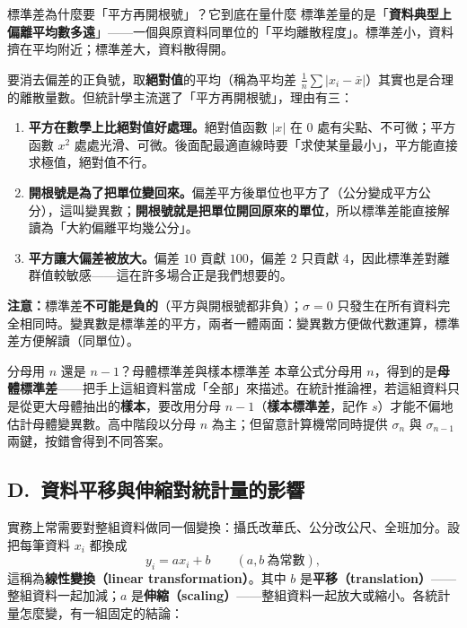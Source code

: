 \documentclass[11pt]{article}
\begin{document}
\begin{補充框}{標準差為什麼要「平方再開根號」？它到底在量什麼}
標準差量的是「\textbf{資料典型上偏離平均數多遠}」——一個與原資料同單位的「平均離散程度」。標準差小，資料擠在平均附近；標準差大，資料散得開。

要消去偏差的正負號，取\textbf{絕對值}的平均（稱為平均差 $\frac1n\sum|x_i-\bar x|$）其實也是合理的離散量數。但統計學主流選了「平方再開根號」，理由有三：
\begin{enumerate}\setlength{\itemsep}{2pt}
\item \textbf{平方在數學上比絕對值好處理。}絕對值函數 $|x|$ 在 $0$ 處有尖點、不可微；平方函數 $x^2$ 處處光滑、可微。後面配最適直線時要「求使某量最小」，平方能直接求極值，絕對值不行。
\item \textbf{開根號是為了把單位變回來。}偏差平方後單位也平方了（公分變成平方公分），這叫變異數；\textbf{開根號就是把單位開回原來的單位}，所以標準差能直接解讀為「大約偏離平均幾公分」。
\item \textbf{平方讓大偏差被放大。}偏差 $10$ 貢獻 $100$，偏差 $2$ 只貢獻 $4$，因此標準差對離群值較敏感——這在許多場合正是我們想要的。
\end{enumerate}
\textbf{注意：}標準差\textbf{不可能是負的}（平方與開根號都非負）；$\sigma=0$ 只發生在所有資料完全相同時。變異數是標準差的平方，兩者一體兩面：變異數方便做代數運算，標準差方便解讀（同單位）。
\end{補充框}


\begin{補充框}{分母用 $n$ 還是 $n-1$？母體標準差與樣本標準差}
本章公式分母用 $n$，得到的是\textbf{母體標準差}——把手上這組資料當成「全部」來描述。在統計推論裡，若這組資料只是從更大母體抽出的\textbf{樣本}，要改用分母 $n-1$（\textbf{樣本標準差}，記作 $s$）才能不偏地估計母體變異數。高中階段以分母 $n$ 為主；但留意計算機常同時提供 $\sigma_n$ 與 $\sigma_{n-1}$ 兩鍵，按錯會得到不同答案。
\end{補充框}

\subsection*{\sffamily D.\ 資料平移與伸縮對統計量的影響}

實務上常需要對整組資料做同一個變換：攝氏改華氏、公分改公尺、全班加分。設把每筆資料 $x_i$ 都換成
$$y_i = a x_i + b \qquad(a,b\ \text{為常數}),$$
這稱為\textbf{線性變換（linear transformation）}。其中 $b$ 是\textbf{平移（translation）}——整組資料一起加減；$a$ 是\textbf{伸縮（scaling）}——整組資料一起放大或縮小。各統計量怎麼變，有一組固定的結論：
\end{document}
